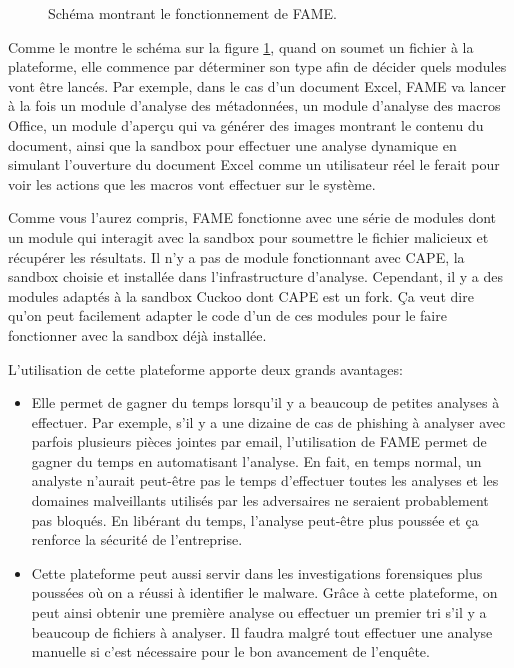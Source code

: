 \begin{figure}
    \centering
    \caption{Schéma montrant le fonctionnement de FAME.}
    \label{fig:fame-explanation}
\end{figure}

Comme le montre le schéma sur la figure \ref{fig:fame-explanation}, quand on soumet un fichier à la plateforme, elle commence par déterminer son type afin de décider quels modules vont être lancés. Par exemple, dans le cas d'un document Excel, FAME va lancer à la fois un module d'analyse des métadonnées, un module d'analyse des macros Office, un module d'aperçu qui va générer des images montrant le contenu du document, ainsi que la sandbox pour effectuer une analyse dynamique en simulant l'ouverture du document Excel comme un utilisateur réel le ferait pour voir les actions que les macros vont effectuer sur le système.

Comme vous l'aurez compris, FAME fonctionne avec une série de modules dont un module qui interagit avec la sandbox pour soumettre le fichier malicieux et récupérer les résultats. Il n'y a pas de module fonctionnant avec CAPE, la sandbox choisie et installée dans l'infrastructure d'analyse. Cependant, il y a des modules adaptés à la sandbox Cuckoo dont CAPE est un fork. Ça veut dire qu'on peut facilement adapter le code d'un de ces modules pour le faire fonctionner avec la sandbox déjà installée.

L'utilisation de cette plateforme apporte deux grands avantages:
\begin{itemize}
    \item Elle permet de gagner du temps lorsqu'il y a beaucoup de petites analyses à effectuer. Par exemple, s'il y a une dizaine de cas de phishing à analyser avec parfois plusieurs pièces jointes par email, l'utilisation de FAME permet de gagner du temps en automatisant l'analyse. En fait, en temps normal, un analyste n'aurait peut-être pas le temps d'effectuer toutes les analyses et les domaines malveillants utilisés par les adversaires ne seraient probablement pas bloqués. En libérant du temps, l'analyse peut-être plus poussée et ça renforce la sécurité de l'entreprise.
    \item Cette plateforme peut aussi servir dans les investigations forensiques plus poussées où on a réussi à identifier le malware. Grâce à cette plateforme, on peut ainsi obtenir une première analyse ou effectuer un premier tri s'il y a beaucoup de fichiers à analyser. Il faudra malgré tout effectuer une analyse manuelle si c'est nécessaire pour le bon avancement de l'enquête.
\end{itemize}

